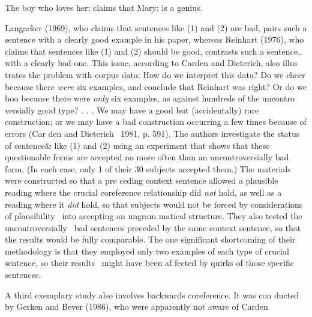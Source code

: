 \begin{listWWNumlxviiileveli}
\item 
\begin{styleStandard}
The boy who loves her; claims that Mary; is a genius.
\end{styleStandard}


\end{listWWNumlxviiileveli}
\begin{styleStandard}
Langacker (1969), who claims that sentences like (1) and (2) are bad, pairs such a sentence with a clearly good example in his paper, whereas Reinhart (1976), who claims that sentences like (1) and (2) should be good, contrasts such a sentence.. with a clearly bad one. This issue, according to Carden and Dieterich, also illus\- trates the problem with corpus data: {\textquotedbl}How do we interpret this data? Do we cheer because there \textit{were}\textit{ }six examples, and conclude that Reinhart was right? Or do we boo because there were \textit{only}\textit{ }six examples, as against hundreds of the uncontro\- versially good type? . . . We may have a good but (accidentally) rare construction; or we may have a bad construction occurring a few times because of errors{\textquotedbl} (Car\- den and Dieterich \ 1981, p. 591). The authors investigate the status of sentence\& like (1) and (2) using an experiment that shows that these questionable forms are accepted no more often than an uncontroversially bad form. (In each case, only 1 of their 30 subjects accepted them.) The materials were constructed so that a pre\- ceding context sentence allowed a plausible reading where the crucial coreference relationship did \textit{not}\textit{ }hold, as well as a reading where it \textit{did}\textit{ }hold, so that subjects would not be forced by considerations of plausibility \ into accepting an ungram\- matical structure. They also tested the uncontroversially \ bad sentences preceded by the same context sentence, so that the results would be fully comparable. The one significant shortcoming of their methodology is that they employed only two examples of each type of crucial sentence, so their results \ might have been af\- fected by quirks of those specific sentences.
\end{styleStandard}


\begin{styleStandard}
A third exemplary study also involves backwards coreference. It was con\- ducted by Gerken and Bever (1986), who were apparently not aware of Carden
\end{styleStandard}


